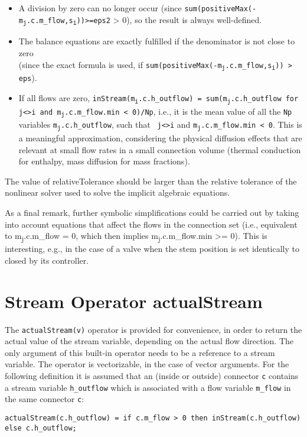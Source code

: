 \begin{nonnormative}
\begin{itemize}
\item
  A division by zero can no longer occur (since \texttt{sum(positiveMax(-m\textsubscript{j}.c.m\_flow,s\textsubscript{i}))\textgreater{}=eps2}
  \textgreater{} 0), so the result is always well-defined.
\item
  The balance equations are exactly fulfilled if the denominator
  is not close to zero\\
  (since the exact formula is used, if
  \texttt{sum(positiveMax(-m\textsubscript{j}.c.m\_flow,s\textsubscript{i})) \textgreater{} eps}).
\item
  If all flows are zero,
  \texttt{inStream(m\textsubscript{i}.c.h\_outflow) =
  sum(m\textsubscript{j}.c.h\_outflow for
  j\textless{}\textgreater{}i and m\textsubscript{j}.c.m\_flow.min \textless{}
  0)/Np}, i.e., it is the mean value of all the \lstinline!Np! variables
  \texttt{m\textsubscript{j}.c.h\_outflow}, such that \texttt{
  j\textless{}\textgreater{}i} and
  \texttt{m\textsubscript{j}.c.m\_flow.min \textless{} 0}. This is a
  meaningful approximation, considering the physical diffusion effects
  that are relevant at small flow rates in a small connection volume
  (thermal conduction for enthalpy, mass diffusion for mass fractions).
\end{itemize}

The value of relativeTolerance should be larger than the relative
tolerance of the nonlinear solver used to solve the implicit algebraic
equations.

As a final remark, further symbolic simplifications could be
carried out by taking into account equations that affect the flows in
the connection set (i.e., equivalent to m\textsubscript{j}.c.m\_flow =
0, which then implies m\textsubscript{j}.c.m\_flow.min \textgreater{}=
0). This is interesting, e.g., in the case of a valve when the stem
position is set identically to closed by its controller.
\end{nonnormative}

\section{Stream Operator actualStream}

The \lstinline!actualStream(v)! operator is provided for convenience, in
order to return the actual value of the stream variable, depending on
the actual flow direction. The only argument of this built-in operator
needs to be a reference to a stream variable. The operator is
vectorizable, in the case of vector arguments. For the following
definition it is assumed that an (inside or outside) connector \lstinline!c!
contains a stream variable \lstinline!h_outflow! which is associated with a flow
variable \lstinline!m_flow! in the same connector \lstinline!c!:
\begin{lstlisting}[language=modelica]
actualStream(c.h_outflow) = if c.m_flow > 0 then inStream(c.h_outflow) else c.h_outflow;
\end{lstlisting}

